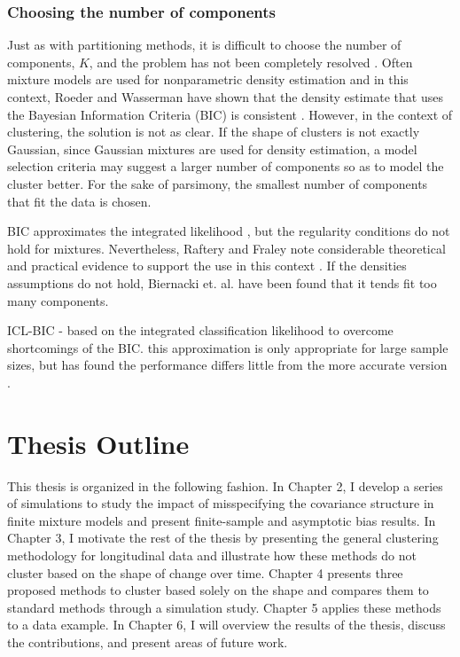 \documentclass[12pt]{article}
\begin{document}
\subsubsection{Choosing the number of components}
Just as with partitioning methods, it is difficult to choose the number of components, $K$, and the problem has not been completely resolved \cite{mclachlan2000}. Often mixture models are used for nonparametric density estimation and in this context, Roeder and Wasserman have shown that the density estimate that uses the Bayesian Information Criteria (BIC) is consistent \cite{roeder1997}. However, in the context of clustering, the solution is not as clear. If the shape of clusters is not exactly Gaussian, since Gaussian mixtures are used for density estimation, a model selection criteria may suggest a larger number of components so as to model the cluster better. For the sake of parsimony, the smallest number of components that fit the data is chosen.

BIC approximates the integrated likelihood \cite{schwarz1978}, but the regularity conditions do not hold for mixtures. Nevertheless, Raftery and Fraley note considerable theoretical and practical evidence to support the use in this context \cite{fraley1998}. If the densities assumptions do not hold, Biernacki et. al. \cite{biernacki2000} have been found that it tends fit too many components. 

ICL-BIC - based on the integrated classification likelihood to overcome shortcomings of the BIC. this approximation is only appropriate for large sample sizes, but has found the performance differs little from the more accurate version \cite{biernacki2000}.


\section{Thesis Outline}
This thesis is organized in the following fashion. In Chapter 2, I develop a series of simulations to study the impact of misspecifying the covariance structure in finite mixture models and present finite-sample and asymptotic bias results. In Chapter 3, I motivate the rest of the thesis by presenting the general clustering methodology for longitudinal data and illustrate how these methods do not cluster based on the shape of change over time. Chapter 4 presents three proposed methods to cluster based solely on the shape and compares them to standard methods through a simulation study. Chapter 5 applies these methods to a data example. In Chapter 6, I will overview the results of the thesis, discuss the contributions, and present areas of future work. 
\end{document}
